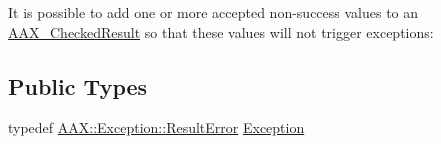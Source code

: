 It is possible to add one or more accepted non-\/success values to an \mbox{\hyperlink{a01601}{A\+A\+X\+\_\+\+Checked\+Result}} so that these values will not trigger exceptions\+:


\begin{DoxyCode}{0}
\DoxyCodeLine{\textcolor{keywordflow}{try} \{}
\DoxyCodeLine{  \textcolor{comment}{// handle the exception}}
\DoxyCodeLine{\}}
\end{DoxyCode}
 \subsection*{Public Types}
\begin{DoxyCompactItemize}
\item 
typedef \mbox{\hyperlink{a01597}{A\+A\+X\+::\+Exception\+::\+Result\+Error}} \mbox{\hyperlink{a01601_a36fd71afc6d62993c1dd96e1ca9fcc0e}{Exception}}
\end{DoxyCompactItemize}
